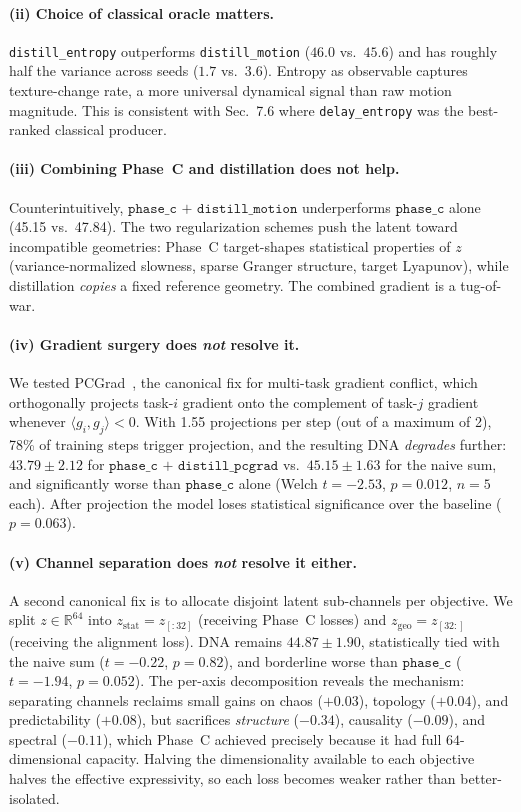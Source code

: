 \documentclass[11pt,a4paper]{article}
\begin{document}
\paragraph{(ii) Choice of classical oracle matters.}
\texttt{distill\_entropy} outperforms \texttt{distill\_motion}
($46.0$ vs.\ $45.6$) and has roughly half the variance across seeds
($1.7$ vs.\ $3.6$). Entropy as observable captures texture-change
rate, a more universal dynamical signal than raw motion magnitude.
This is consistent with Sec.~7.6 where \texttt{delay\_entropy} was
the best-ranked classical producer.

\paragraph{(iii) Combining Phase~C and distillation does not help.}
Counterintuitively, $\texttt{phase\_c + distill\_motion}$ underperforms
$\texttt{phase\_c}$ alone (45.15 vs.\ 47.84). The two regularization
schemes push the latent toward incompatible geometries: Phase~C
target-shapes statistical properties of $z$ (variance-normalized
slowness, sparse Granger structure, target Lyapunov), while
distillation \emph{copies} a fixed reference geometry. The combined
gradient is a tug-of-war.

\paragraph{(iv) Gradient surgery does \emph{not} resolve it.}
We tested PCGrad~\cite{yu2020pcgrad}, the canonical fix for multi-task
gradient conflict, which orthogonally projects task-$i$ gradient onto
the complement of task-$j$ gradient whenever
$\langle g_i,g_j\rangle < 0$. With 1.55 projections per step (out of a
maximum of 2), 78\% of training steps trigger projection, and the
resulting DNA \emph{degrades} further: $43.79 \pm 2.12$ for
$\texttt{phase\_c + distill\_pcgrad}$ vs.\ $45.15 \pm 1.63$ for the
naive sum, and significantly worse than $\texttt{phase\_c}$ alone
(Welch $t=-2.53$, $p=0.012$, $n=5$ each). After projection the model
loses statistical significance over the baseline ($p=0.063$).

\paragraph{(v) Channel separation does \emph{not} resolve it either.}
A second canonical fix is to allocate disjoint latent sub-channels per
objective. We split $z \in \mathbb{R}^{64}$ into
$z_{\text{stat}} = z_{[:32]}$ (receiving Phase~C losses) and
$z_{\text{geo}} = z_{[32:]}$ (receiving the alignment loss). DNA
remains $44.87 \pm 1.90$, statistically tied with the naive sum
($t=-0.22$, $p=0.82$), and borderline worse than $\texttt{phase\_c}$
($t=-1.94$, $p=0.052$). The per-axis decomposition reveals the
mechanism: separating channels reclaims small gains on chaos
($+0.03$), topology ($+0.04$), and predictability ($+0.08$), but
sacrifices \emph{structure} ($-0.34$), causality ($-0.09$), and
spectral ($-0.11$), which Phase~C achieved precisely because it had
full $64$-dimensional capacity. Halving the dimensionality available
to each objective halves the effective expressivity, so each loss
becomes weaker rather than better-isolated.
\end{document}

